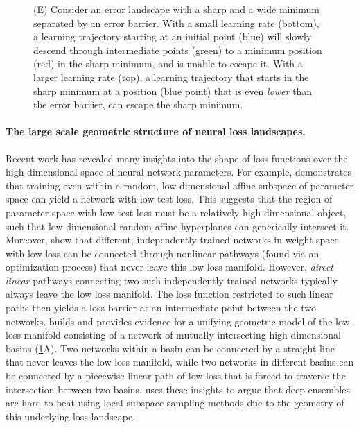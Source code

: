 \documentclass{article}
\begin{document}
\begin{figure}[t!]
{(E) Consider an error landscape with a sharp and a wide minimum separated by an error barrier.  With a small learning rate (bottom), a learning trajectory starting at an initial point (blue) will slowly descend through intermediate points (green) to a minimum position (red) in the sharp minimum, and is unable to escape it. 
With a larger learning rate (top), a learning trajectory that starts in the sharp minimum 
at a position (blue point) that is even \emph{lower} than the error barrier, can escape the 
sharp minimum.}
\vspace{-0.3cm}
\label{fig:conceptual}
\end{figure}

\paragraph{The large scale geometric structure of neural loss landscapes.} Recent work 
has revealed many insights into the shape of loss functions over the high dimensional space of neural network parameters.  
For example, \citep{li2018measuring,goldilocks} demonstrates 
%
that training even within a random, low-dimensional affine subspace of parameter space can yield a network with low test loss. This suggests that the region of parameter space with low test loss must be a relatively high dimensional object, such that low dimensional random affine hyperplanes can generically intersect it.  
Moreover, \citep{draxler2018essentially,kuditipudi2019explaining,garipov2018loss} show that different, independently trained networks in weight space with low loss can be connected through nonlinear pathways (found via an optimization process) that never leave this low loss manifold.  
However,
\emph{direct linear} pathways connecting two such independently trained networks typically always leave the low loss manifold.  
The loss function restricted to such linear paths then yields a loss barrier at an intermediate point between the two networks. 
\citep{fort2019large} builds and provides evidence for a unifying geometric model of the low-loss manifold consisting of a network of mutually intersecting high dimensional basins (\cref{fig:conceptual}A). Two networks within a basin
can be connected by a straight line that never leaves the low-loss manifold, while two networks in different basins can be connected by a piecewise linear path of low loss that is forced to traverse the intersection between two basins.  
\cite{fort2019deep} uses these insights to argue that deep ensembles are hard to beat using local subspace sampling methods due to the geometry of this underlying loss landscape. 
\end{document}
